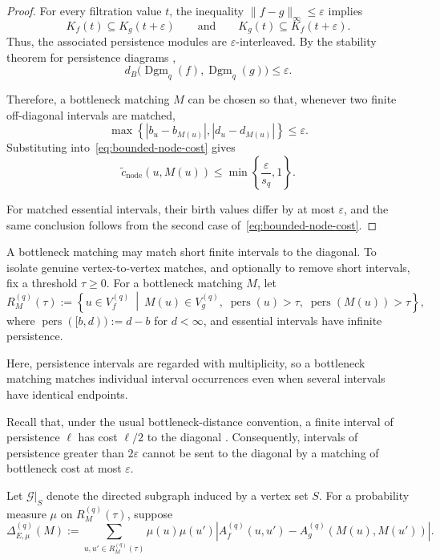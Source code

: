 \documentclass[11pt]{article}
\theoremstyle{paperdefinition}
\theoremstyle{paperplain}
\theoremstyle{paperremark}
\begin{document}
\begin{proof}
For every filtration value $t$, the inequality $\|f-g\|_\infty\leq\varepsilon$ implies
\[
K_f(t)\subseteq K_g(t+\varepsilon) \qquad\text{and}\qquad K_g(t)\subseteq K_f(t+\varepsilon).
\]
Thus, the associated persistence modules are $\varepsilon$-interleaved. By the stability theorem for persistence diagrams \cite{cohensteiner2007stability},
\[
d_B\bigl(\operatorname{Dgm}_q(f),\operatorname{Dgm}_q(g)\bigr) \leq\varepsilon.
\]

Therefore, a bottleneck matching $M$ can be chosen so that, whenever two finite off-diagonal intervals are matched,
\[
\max\left\{|b_u-b_{M(u)}|, |d_u-d_{M(u)}|\right\} \leq \varepsilon.
\]
Substituting into~\eqref{eq:bounded-node-cost} gives
\[
\widetilde c_{\mathrm{node}}(u,M(u)) \leq \min\left\{ \frac{\varepsilon}{s_q}, 1 \right\}.
\]

For matched essential intervals, their birth values differ by at most $\varepsilon$, and the same conclusion follows from the second case of~\eqref{eq:bounded-node-cost}.
\end{proof}

A bottleneck matching may match short finite intervals to the diagonal. To isolate genuine vertex-to-vertex matches, and optionally to remove short intervals, fix a threshold $\tau\geq0$. For a bottleneck matching $M$, let
\[
R_M^{(q)}(\tau) := \left\{u\in V_f^{(q)} \ \middle|\ M(u)\in V_g^{(q)},\; \operatorname{pers}(u)>\tau,\; \operatorname{pers}(M(u))>\tau \right\},
\]
where $\operatorname{pers}([b,d)) := d-b$ for $d<\infty$, and essential intervals have infinite persistence.

Here, persistence intervals are regarded with multiplicity, so a bottleneck matching matches individual interval occurrences even when several intervals have identical endpoints.

Recall that, under the usual bottleneck-distance convention, a finite interval of persistence $\ell$ has cost $\ell/2$ to the diagonal \cite{cohensteiner2007stability,edelsbrunnerharer2010computational}. Consequently, intervals of persistence greater than $2\varepsilon$ cannot be sent to the diagonal by a matching of bottleneck cost at most $\varepsilon$.

Let $\mathcal G|_S$ denote the directed subgraph induced by a vertex set $S$. For a probability measure $\mu$ on $R_M^{(q)}(\tau)$, suppose
\begin{equation}
\label{eq:edge-disagreement}
\Delta_{E,\mu}^{(q)}(M) := \sum_{u,u'\in R_M^{(q)}(\tau)} \mu(u)\mu(u') \left| A_f^{(q)}(u,u') - A_g^{(q)}(M(u),M(u')) \right|.
\end{equation}
\end{document}
